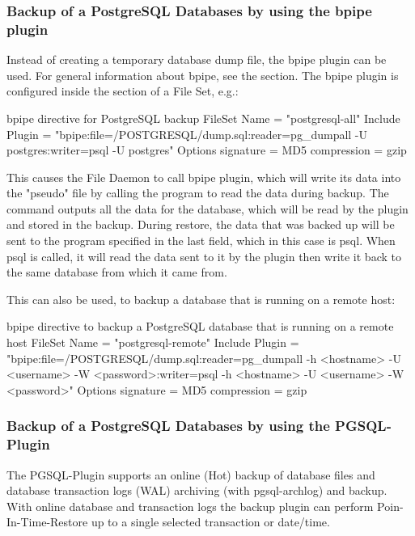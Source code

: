 \subsubsection{Backup of a PostgreSQL Databases by using the bpipe plugin}

Instead of creating a temporary database dump file,
the bpipe plugin can be used. 
For general information about bpipe, see the  section. 
The bpipe plugin is configured inside the  section of a File Set, e.g.:
\begin{bconfig}{bpipe directive for PostgreSQL backup}
FileSet {
  Name = "postgresql-all"
  Include {
    Plugin = "bpipe:file=/POSTGRESQL/dump.sql:reader=pg_dumpall -U postgres:writer=psql -U postgres"
    Options {
      signature = MD5
      compression = gzip
    }
  }
}
\end{bconfig}

This causes the File Daemon to call bpipe plugin, which will write its data into the "pseudo" file  by
calling the program  to read the data during backup. The  command outputs all 
the data for the database, which will be read by the plugin and stored in the backup. During restore, the data that was backed up will
be sent to the program specified in the last field, which in this case is psql. When psql is called, it will read the data sent to it by 
the plugin then write it back to the same database from which it came from.

This can also be used, to backup a database that is running on a remote host:
\begin{bconfig}{bpipe directive to backup a PostgreSQL database that is running on a remote host}
FileSet {
  Name = "postgresql-remote"
  Include {
    Plugin = "bpipe:file=/POSTGRESQL/dump.sql:reader=pg_dumpall -h <hostname> -U <username> -W <password>:writer=psql -h <hostname> -U <username> -W <password>"
    Options {
      signature = MD5
      compression = gzip
    }
  }
}
\end{bconfig}

\subsubsection{Backup of a PostgreSQL Databases by using the PGSQL-Plugin}
\label{backup-postgresql-plugin}

The PGSQL-Plugin supports an online (Hot) backup of database files and database transaction logs (WAL) archiving (with pgsql-archlog) and backup. With online database and transaction logs the backup plugin can perform Poin-In-Time-Restore up to a single selected transaction or date/time. 

